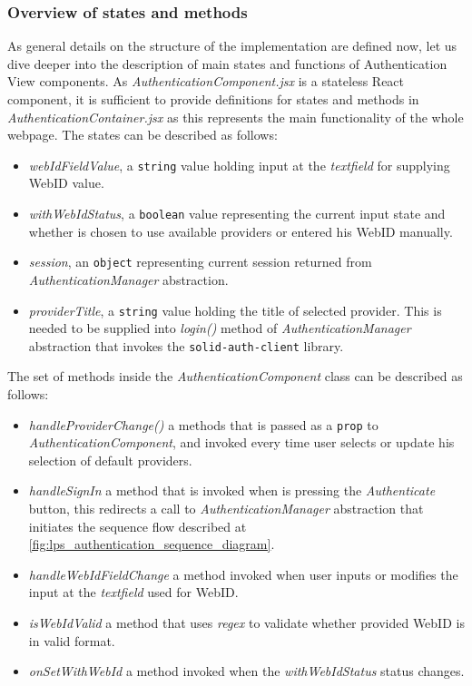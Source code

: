 \subsubsection{Overview of states and methods}

As general details on the structure of the implementation are defined now, let us dive deeper into the description of main states and functions of Authentication View components. As \textit{AuthenticationComponent.jsx} is a stateless React component, it is sufficient to provide definitions for states and methods in \textit{AuthenticationContainer.jsx} as this represents the main functionality of the whole webpage. The states can be described as follows:
\begin{itemize}
    \item \textit{webIdFieldValue}, a \texttt{string} value holding input at the \textit{textfield} for supplying WebID value.
    \item \textit{withWebIdStatus}, a \texttt{boolean} value representing the current input state and whether is chosen to use available providers or entered his WebID manually.
    \item \textit{session}, an \texttt{object} representing current session returned from \textit{AuthenticationManager} abstraction.
    \item \textit{providerTitle}, a \texttt{string} value holding the title of selected provider. This is needed to be supplied into \textit{login()} method of \textit{AuthenticationManager} abstraction that invokes the \texttt{solid-auth-client} library.  
\end{itemize}

The set of methods inside the \textit{AuthenticationComponent} class can be described as follows:
\begin{itemize}
    \item \textit{handleProviderChange()} a methods that is passed as a \texttt{prop} to \textit{AuthenticationComponent}, and invoked every time user selects or update his selection of default providers.
    \item \textit{handleSignIn} a method that is invoked when is pressing the \textit{Authenticate} button, this redirects a call to \textit{AuthenticationManager} abstraction that initiates the sequence flow described at \autoref{fig:lps_authentication_sequence_diagram}.
    \item \textit{handleWebIdFieldChange} a method invoked when user inputs or modifies the input at the \textit{textfield} used for WebID.
    \item \textit{isWebIdValid} a method that uses \textit{regex} to validate whether provided WebID is in valid format.
    \item \textit{onSetWithWebId} a method invoked when the \textit{withWebIdStatus} status changes.  
\end{itemize}


